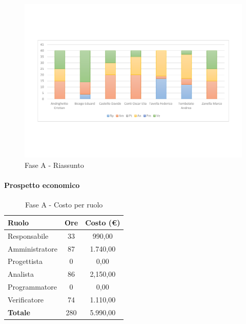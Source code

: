 \documentclass[../PianoProgetto.tex]{subfiles}
\begin{document}
	\begin{figure}[!h]
		\centering
		\includegraphics[width=\textwidth , trim=2cm 5cm 2cm 5cm]{grafici/A/A-ore-persona}
			\caption{Fase A - Riassunto}
		\label{fig:BarChart-faseA_ore}
	\end{figure}	
	
\newpage
	\vfill	
	\paragraph{Prospetto economico}
						
	\begin{table}[h]
		\centering
		\begin{tabular}{l * {2}{c}}
			\toprule
			\textbf{Ruolo} & \textbf{Ore} & \textbf{Costo (\euro{})} \\
			\midrule
			Responsabile &	33 &  990,00 \\
			Amministratore & 87 &  1.740,00 \\
			Progettista & 0 & 0,00 \\
			Analista & 86 & 2,150,00 \\
			Programmatore & 0 & 0,00 \\
			Verificatore & 74 & 1.110,00 \\
			\midrule		
			\textbf{Totale} & 280 & 5.990,00 \\
			\bottomrule	
		\end{tabular}
		\caption{Fase A - Costo per ruolo}
		\label{tab:faseA_costo}
	\end{table}
\end{document}
